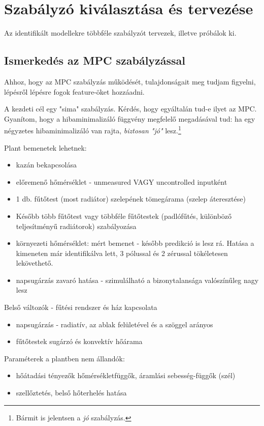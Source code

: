 \section{Szabályzó kiválasztása és tervezése}


Az identifikált modellekre többféle szabályzót tervezek, illetve próbálok ki.

\subsection{Ismerkedés az MPC szabályzással}

Ahhoz, hogy az MPC szabályzás működését, tulajdonságait meg tudjam figyelni, lépésről lépésre fogok feature-öket hozzáadni.

A kezdeti cél egy "sima" szabályzás. Kérdés, hogy egyáltalán tud-e ilyet az MPC. Gyanítom, hogy a hibaminimalizáló függvény megfelelő megadásával tud: ha egy négyzetes hibaminimalizáló van rajta, \textit{biztosan "jó"} lesz.\footnote{Bármit is jelentsen a \textit{jó} szabályzás.}

\begin{formal}
	Plant bemenetek lehetnek:
	\begin{itemize}[noitemsep,topsep=-8pt,parsep=0pt,partopsep=0pt]
		\item kazán bekapcsolása
		\item előremenő hőmérséklet - unmeasured VAGY uncontrolled inputként
		\item 1 db. fűtőtest (most radiátor) szelepének tömegárama (szelep áteresztése)
		\item Később több fűtőtest vagy többféle fűtőtestek (padlófűtés, különböző teljesítményű radiátorok) szabályozása
		\item környezeti hőmérséklet: mért bemenet - később predikció is lesz rá. Hatása a kimeneten már identifikálva lett, 3 pólussal és 2 zérussal tökéletesen lekövethető.
		\item napsugárzás zavaró hatása - szimulálható  a bizonytalansága valószínűleg nagy lesz
	\end{itemize}

	Belső változók - fűtési rendszer és ház kapcsolata
	\begin{itemize}[noitemsep,topsep=-6pt,parsep=0pt,partopsep=0pt]
			\item napsugárzás - radiatív, az ablak felületével és a szöggel arányos
			\item fűtőtestek sugárzó és konvektív hőárama
	\end{itemize}

	Paraméterek a plantben nem állandók:
	\begin{itemize}[noitemsep,topsep=-6pt,parsep=0pt,partopsep=0pt]
		\item hőátadási tényezők hőmérsékletfüggők, áramlási sebesség-függők (szél)
		\item szellőztetés, belső hőterhelés hatása
	\end{itemize}
\end{formal}

